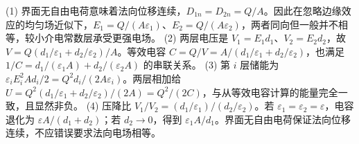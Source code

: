 (1) 界面无自由电荷意味着法向位移连续，\(D_{1n}=D_{2n}=Q/A\)。因此在忽略边缘效应的均匀场近似下，\(E_1=Q/(A\varepsilon_1)\)、\(E_2=Q/(A\varepsilon_2)\)，两者同向但一般并不相等，较小介电常数层承受更强电场。
(2) 两层电压是 \(V_1=E_1d_1\)、\(V_2=E_2d_2\)，故 \(V=Q(d_1/\varepsilon_1+d_2/\varepsilon_2)/A\)。等效电容 \(C=Q/V=A/(d_1/\varepsilon_1+d_2/\varepsilon_2)\)，也满足 \(1/C=d_1/(\varepsilon_1A)+d_2/(\varepsilon_2A)\) 的串联关系。
(3) 第 \(i\) 层储能为 \(\varepsilon_iE_i^2Ad_i/2=Q^2d_i/(2A\varepsilon_i)\)。两层相加给 \(U=Q^2(d_1/\varepsilon_1+d_2/\varepsilon_2)/(2A)=Q^2/(2C)\)，与从等效电容计算的能量完全一致，且显然非负。
(4) 压降比 \(V_1/V_2=(d_1/\varepsilon_1)/(d_2/\varepsilon_2)\)。若 \(\varepsilon_1=\varepsilon_2=\varepsilon\)，电容退化为 \(\varepsilon A/(d_1+d_2)\)；若 \(d_2\to0\)，得到 \(\varepsilon_1A/d_1\)。界面无自由电荷保证法向位移连续，不应错误要求法向电场相等。
